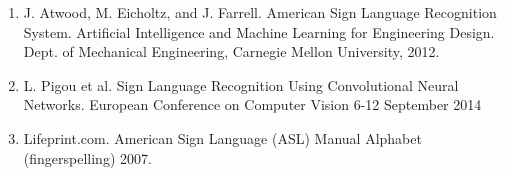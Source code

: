 \begin{enumerate}
    \item J. Atwood, M. Eicholtz, and J. Farrell. American Sign
Language Recognition System. Artificial Intelligence and
Machine Learning for Engineering Design. Dept. of
Mechanical Engineering, Carnegie Mellon University,
2012.

    \item L. Pigou et al. Sign Language Recognition Using
Convolutional Neural Networks. European Conference on
Computer Vision 6-12 September 2014

    \item   Lifeprint.com. American Sign Language (ASL) Manual
Alphabet (fingerspelling) 2007.

\end{enumerate}


\newpage
